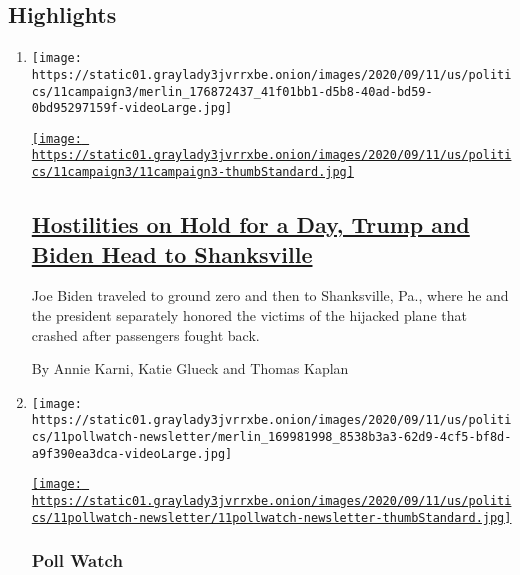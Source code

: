 \hypertarget{highlights}{%
\subsection{Highlights}\label{highlights}}

\begin{enumerate}
\def\labelenumi{\arabic{enumi}.}
\item
  \texttt{[image: https://static01.graylady3jvrrxbe.onion/images/2020/09/11/us/politics/11campaign3/merlin\_176872437\_41f01bb1-d5b8-40ad-bd59-0bd95297159f-videoLarge.jpg]}

  \href{/2020/09/11/us/politics/shanksville-trump-biden.html}{\texttt{[image: https://static01.graylady3jvrrxbe.onion/images/2020/09/11/us/politics/11campaign3/11campaign3-thumbStandard.jpg]}}

  \hypertarget{hostilities-on-hold-for-a-day-trump-and-biden-head-to-shanksville}{%
  \subsection{\texorpdfstring{\href{/2020/09/11/us/politics/shanksville-trump-biden.html}{Hostilities
  on Hold for a Day, Trump and Biden Head to
  Shanksville}}{Hostilities on Hold for a Day, Trump and Biden Head to Shanksville}}\label{hostilities-on-hold-for-a-day-trump-and-biden-head-to-shanksville}}

  Joe Biden traveled to ground zero and then to Shanksville, Pa., where
  he and the president separately honored the victims of the hijacked
  plane that crashed after passengers fought back.

  By Annie Karni, Katie Glueck and Thomas Kaplan
\item
  \texttt{[image: https://static01.graylady3jvrrxbe.onion/images/2020/09/11/us/politics/11pollwatch-newsletter/merlin\_169981998\_8538b3a3-62d9-4cf5-bf8d-a9f390ea3dca-videoLarge.jpg]}

  \href{/2020/09/11/us/politics/joe-biden-polling-trump.html}{\texttt{[image: https://static01.graylady3jvrrxbe.onion/images/2020/09/11/us/politics/11pollwatch-newsletter/11pollwatch-newsletter-thumbStandard.jpg]}}

  \hypertarget{poll-watch}{%
  \subsubsection{Poll Watch}\label{poll-watch}}

  \hypertarget{democrats-gained-these-voters-in-2018-and-biden-needs-to-keep-them-now}{%
}
\end{enumerate}
